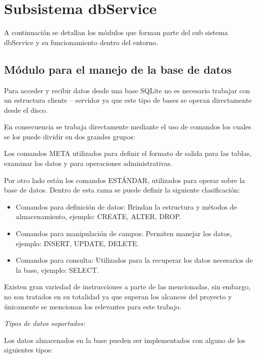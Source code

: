\section{Subsistema dbService}

A continuación se detallan los módulos que forman parte del sub sistema dbService y su funcionamiento dentro del entorno.
\subsection{Módulo para el manejo de la base de datos}

Para acceder y recibir datos desde una base SQLite no es necesario trabajar con un estructura cliente – servidor ya que este tipo de bases se operan directamente desde el disco.

En consecuencia se trabaja directamente mediante el uso de comandos los cuales se los puede dividir en dos grandes grupos: 

Los comandos META utilizados para definir el formato de salida para las tablas, examinar los datos y para operaciones administrativas.

Por otro lado están los comandos ESTÁNDAR, utilizados para operar sobre la base de datos. Dentro de esta rama se puede definir la siguiente clasificación:

\begin{itemize}
\item Comandos para definición de datos: Brindan la estructura y métodos de almacenamiento, ejemplo: CREATE, ALTER, DROP. 
\item Comandos para manipulación de campos: Permiten manejar los datos, ejemplo: INSERT, UPDATE, DELETE.
\item Comandos para consulta: Utilizados para la recuperar los datos necesarios de la base, ejemplo: SELECT.
\end{itemize}

Existen gran variedad de instrucciones a parte de las mencionadas, sin embargo, no son tratados en su totalidad ya que superan los alcances del proyecto y únicamente se mencionan los relevantes para este trabajo.


\textsl{Tipos de datos soportados:}

Los datos almacenados en la base pueden ser implementados con alguno de los siguientes tipos:

